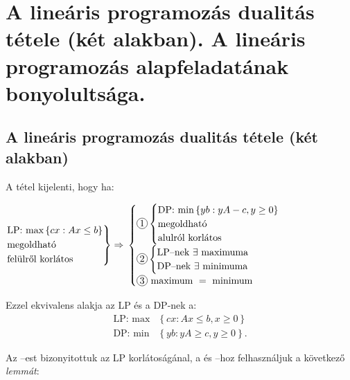\newpage
\section{A lineáris programozás dualitás tétele (két alakban). A lineáris programozás alapfeladatának bonyolultsága.}

\subsection{A lineáris programozás dualitás tétele (két alakban)}
A tétel kijelenti, hogy ha: 

$ \begin{rcases}
\mbox{LP: max}\left\{cx:Ax \leq b\right\} \\
\mbox{megoldható} \\
\mbox{felülről korlátos}
\end{rcases} \Rightarrow$ $\begin{cases}
\circled{1} \begin{cases}
\mbox{DP: min} \left\{ yb:yA - c, y \geq 0 \right\} \\
	\mbox{megoldható} \\ 
	\mbox{alulról korlátos}  
\end{cases} \\
\circled{2} \begin{cases}
\mbox{LP--nek } \exists \mbox{ maximuma} \\
\mbox{DP--nek } \exists \mbox{ minimuma} 
\end{cases}\\
\circled{3} \mbox{ maximum } = \mbox{ minimum}
\end{cases}$

Ezzel ekvivalens alakja az LP és a DP-nek a:
\begin{align*}
\mbox{LP: max} &\left\{ cx:Ax \leq b, x \geq 0 \right\} \\
\mbox{DP: min} &\left\{ yb:yA \geq c, y \geq 0 \right\}.
\end{align*}

Az --est bizonyitottuk az LP korlátoságánal, a  és 
--hoz felhasználjuk a következő \emph{lemmát}:

